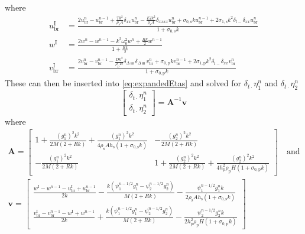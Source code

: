 \documentclass{article}
\begin{document}
where
\begin{subequations}\label{eq:intermediateColCol}
    \begin{align}
        u^\text{I}_\text{br}& = \frac{2u_\text{br}^n-u_\text{br}^{n-1}+\frac{Tk^2}{\rho_\text{s}A}\delta_{xx}u_\text{br}^n-\frac{EIk^2}{\rho_\text{s}A}\delta_{xxxx}u_\text{br}^n + \sigma_{0,\text{s}}ku_\text{br}^{n-1} + 2\sigma_{1,\text{s}}k^2\delta_{t-}\delta_{xx}u^n_\text{br}}{1 + \sigma_{0,\text{s}}k} \\
        w^\text{I} & = \frac{2w^n-w^{n-1}-k^2\omega_0^2w^n+\frac{Rk}{2}w^{n-1}}{1 + \frac{Rk}{2}}\\
        v^\text{I}_{\text{br}} & = \frac{2v_{\text{br}}^n-v_{\text{br}}^{n-1}-\frac{Dk^2}{\rho_\text{p}H}\delta_{\Delta\boxplus}\delta_{\Delta\boxplus}v_{\text{br}}^n+\sigma_{0,\text{p}}kv^{n-1}_\text{br}+ 2\sigma_{1,\text{p}}k^2\delta_{t-}\delta_{xx}v^n_\text{br}}{1+\sigma_{0,\text{p}}k}
    \end{align}
\end{subequations}
These can then be inserted into \eqref{eq:expandedEtas} and solved for $\delta_{t\cdot}\eta_1^n$ and $\delta_{t\cdot}\eta_2^n$
\begin{equation}
    \begin{bmatrix}
        \delta_{t\cdot}\eta_1^n\\
        \delta_{t\cdot}\eta_2^n
    \end{bmatrix}
    = 
    \mathbf{A}^{-1}\mathbf{v}
\end{equation}
where
\begin{equation}
\begin{gathered}
\mathbf{A} = 
    \begin{bmatrix}
        1 + \frac{(g_1^n)^2k^2}{2M(2+Rk)} + \frac{(g_1^n)^2k^2}{4\rho_\text{s}Ah_\text{s}(1+\sigma_{0,\text{s}}k)} & -\frac{(g_2^n)^2k^2}{2M(2+Rk)} \\
        -\frac{(g_1^n)^2k^2}{2M(2+Rk)} & 1+\frac{(g_2^n)^2k^2}{2M(2+Rk)}+\frac{(g_2^n)^2k^2}{4h_\text{p}^2\rho_\text{p}H(1+\sigma_{0,\text{p}}k)}
    \end{bmatrix}
    \quad \text{and}\\
    \mathbf{v} = 
    \begin{bmatrix}
        \frac{w^\text{I}-w^{n-1}-u_\text{br}^\text{I}+u_\text{br}^{n-1}}{2k} - \frac{k(\psi_1^{n-1/2}g_1^n-\psi_2^{n-1/2}g_2^n)}{M(2+Rk)}-\frac{\psi_1^{n-1/2}g_1^nk}{2\rho_\text{s}Ah_\text{s}(1+\sigma_{0,\text{s}}k)}\\
        \frac{v_\text{br}^\text{I}-v_\text{br}^{n-1}-w^\text{I}+w^{n-1}}{2k}+\frac{k(\psi_1^{n-1/2}g_1^n-\psi_2^{n-1/2}g_2^n)}{M(2+Rk)}-\frac{\psi_2^{n-1/2}g_2^nk}{2h_\text{p}^2\rho_\text{p}H(1+\sigma_{0,\text{p}}k)}
    \end{bmatrix}
    \nonumber
\end{gathered}
\end{equation}
\end{document}
